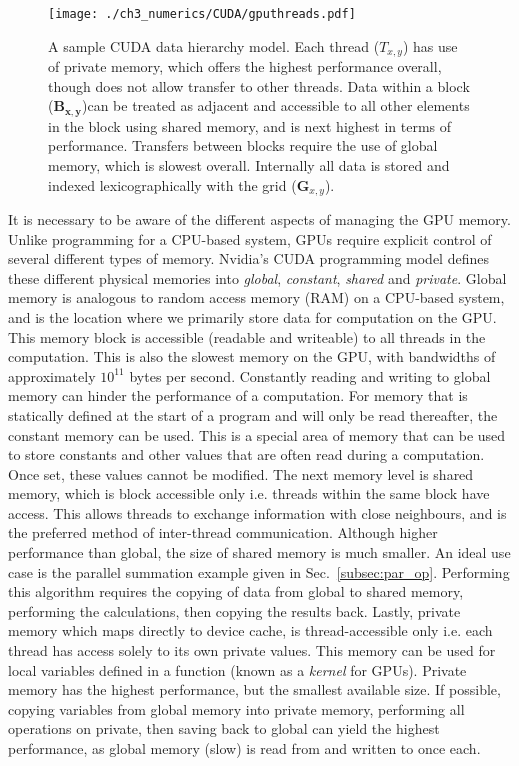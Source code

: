 \begin{figure}[tb]
    \centering
    \texttt{[image: ./ch3\_numerics/CUDA/gputhreads.pdf]}
    \caption{A sample CUDA data hierarchy model. Each thread ($T_{x,y}$) has use of private memory, which offers the highest performance overall, though does not allow transfer to other threads. Data within a block ($\mathbf{B_{x,y}}$)can be treated as adjacent and accessible to all other elements in the block using {shared memory}, and is next highest in terms of performance. Transfers between blocks require the use of {global memory}, which is slowest overall. Internally all data is stored and indexed lexicographically with the grid ($\mathbf{G}_{x,y}$).}
    \label{fig:gpu_threads}
\end{figure}

It is necessary to be aware of the different aspects of managing the GPU memory. Unlike programming for a CPU-based system, GPUs require explicit control of several different types of memory. Nvidia's CUDA programming model defines these different physical memories into \textit{global}, \textit{constant}, \textit{shared} and \textit{private}. Global memory is analogous to random access memory (RAM) on a CPU-based system, and is the location where we primarily store data for computation on the GPU. This memory block is accessible (readable and writeable) to all threads in the computation. This is also the slowest memory on the GPU, with bandwidths of approximately $10^{11}$ bytes per second. Constantly reading and writing to global memory can hinder the performance of a computation. For memory that is statically defined at the start of a program and will only be read thereafter, the constant memory can be used. This is a special area of memory that can be used to store constants and other values that are often read during a computation. Once set, these values cannot be modified. The next memory level is shared memory, which is block accessible only i.e. threads within the same block have access. This allows threads to exchange information with close neighbours, and is the preferred method of inter-thread communication. Although higher performance than global, the size of shared memory is much smaller. An ideal use case is the parallel summation example given in Sec.~\ref{subsec:par_op}. Performing this algorithm requires the copying of data from global to shared memory, performing the calculations, then copying the results back. Lastly, private memory which maps directly to device cache, is thread-accessible only i.e. each thread has access solely to its own private values. This memory can be used for local variables defined in a function (known as a \textit{kernel} for GPUs). Private memory has the highest performance, but the smallest available size. If possible, copying variables from global memory into private memory, performing all operations on private, then saving back to global can yield the highest performance, as global memory (slow) is read from and written to once each.

